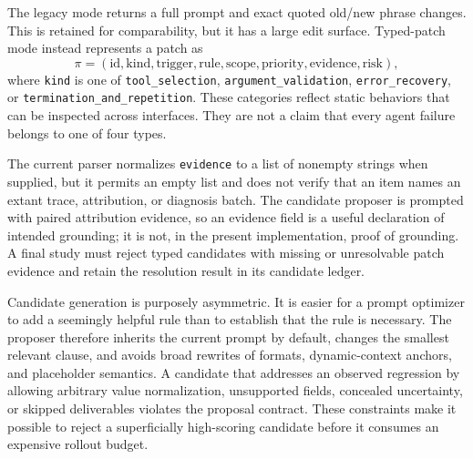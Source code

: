 \documentclass[10pt]{article}
\begin{document}
The legacy mode returns a full prompt and exact quoted old/new phrase changes. This is retained for comparability, but it has a large edit surface. Typed-patch mode instead represents a patch as
\begin{equation}
\pi=(\mathrm{id},\mathrm{kind},\mathrm{trigger},\mathrm{rule},\mathrm{scope},\mathrm{priority},\mathrm{evidence},\mathrm{risk}),
\label{eq:patch}
\end{equation}
where \texttt{kind} is one of \texttt{tool\_selection}, \texttt{argument\_validation}, \texttt{error\_recovery}, or \texttt{termination\_and\_repetition}. These categories reflect static behaviors that can be inspected across interfaces. They are not a claim that every agent failure belongs to one of four types.

The current parser normalizes \texttt{evidence} to a list of nonempty strings when supplied, but it permits an empty list and does not verify that an item names an extant trace, attribution, or diagnosis batch. The candidate proposer is prompted with paired attribution evidence, so an evidence field is a useful declaration of intended grounding; it is not, in the present implementation, proof of grounding. A final study must reject typed candidates with missing or unresolvable patch evidence and retain the resolution result in its candidate ledger.

Candidate generation is purposely asymmetric. It is easier for a prompt optimizer to add a seemingly helpful rule than to establish that the rule is necessary. The proposer therefore inherits the current prompt by default, changes the smallest relevant clause, and avoids broad rewrites of formats, dynamic-context anchors, and placeholder semantics. A candidate that addresses an observed regression by allowing arbitrary value normalization, unsupported fields, concealed uncertainty, or skipped deliverables violates the proposal contract. These constraints make it possible to reject a superficially high-scoring candidate before it consumes an expensive rollout budget.
\end{document}
